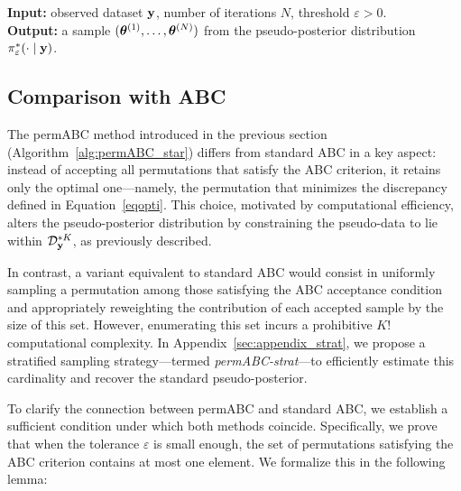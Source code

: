 \begin{algorithm}
\caption{permABC Vanilla}\label{alg:permABC_star}
\textbf{Input: }observed dataset $\mathbf{y}$, number of iterations $N$, threshold $\varepsilon>0$.\\
\textbf{Output: }a sample $(\boldsymbol{\theta}^{(1)}, \dots, \boldsymbol{\theta}^{(N)})$ from the pseudo-posterior distribution $\pi_{\varepsilon}^*(\cdot\mid \mathbf{y})$.\\

\BlankLine

\end{algorithm}

\subsection{Comparison with ABC}
\label{sec:comparison}

The permABC method introduced in the previous section (Algorithm~\ref{alg:permABC_star}) differs from standard ABC in a key aspect: instead of accepting all permutations that satisfy the ABC criterion, it retains only the optimal one—namely, the permutation that minimizes the discrepancy defined in Equation~\eqref{eqopti}. This choice, motivated by computational efficiency, alters the pseudo-posterior distribution by constraining the pseudo-data to lie within $\mathcal{D}^{*K}_{\mathbf{y}}$, as previously described.


In contrast, a variant equivalent to standard ABC would consist in uniformly sampling a permutation among those satisfying the ABC acceptance condition and appropriately reweighting the contribution of each accepted sample by the size of this set. However, enumerating this set incurs a prohibitive $K!$ computational complexity. In Appendix~\ref{sec:appendix_strat}, we propose a stratified sampling strategy—termed \emph{permABC-strat}—to efficiently estimate this cardinality and recover the standard pseudo-posterior.

To clarify the connection between permABC and standard ABC, we establish a sufficient condition under which both methods coincide. Specifically, we prove that when the tolerance $\varepsilon$ is small enough, the set of permutations satisfying the ABC criterion contains at most one element. We formalize this in the following lemma:

